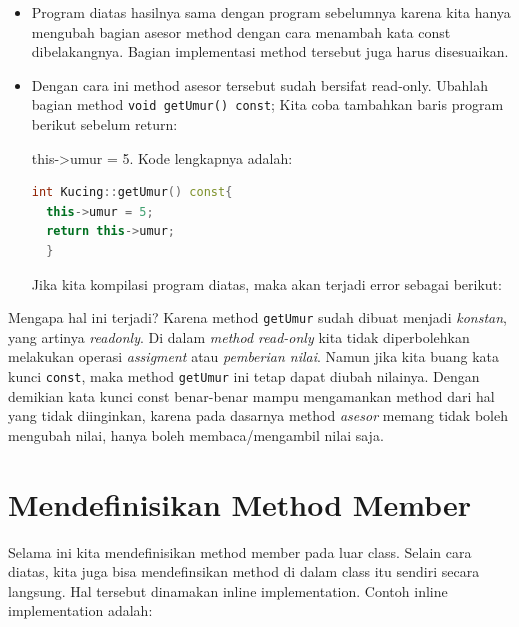 \begin{itemize}
\item
  Program diatas hasilnya sama dengan program sebelumnya karena kita
  hanya mengubah bagian asesor method dengan cara menambah kata const
  dibelakangnya. Bagian implementasi method tersebut juga harus
  disesuaikan.
\item
  Dengan cara ini method asesor tersebut sudah bersifat read-only.
  Ubahlah bagian method \texttt{void\ getUmur()\ const}; Kita coba
  tambahkan baris program berikut sebelum return:

  this-\textgreater{}umur = 5.
  Kode lengkapnya adalah:
  
  \begin{lstlisting}[language=c++, numbers=none]
  int Kucing::getUmur() const{
  this->umur = 5;
  return this->umur;
  }
  \end{lstlisting}
  
  Jika kita kompilasi program diatas, maka akan terjadi error sebagai
  berikut:
  
  \begin{figure}[htbp]
  	\centering
{}

  \end{figure}
\end{itemize}



Mengapa hal ini terjadi? Karena method \texttt{getUmur} sudah dibuat
menjadi \emph{konstan}, yang artinya \emph{readonly}. Di dalam
\emph{method read-only} kita tidak diperbolehkan melakukan operasi
\emph{assigment} atau \emph{pemberian nilai}. Namun jika kita buang kata
kunci \texttt{const}, maka method \texttt{getUmur} ini tetap dapat
diubah nilainya. Dengan demikian kata kunci const benar-benar mampu
mengamankan method dari hal yang tidak diinginkan, karena pada dasarnya
method \emph{asesor} memang tidak boleh mengubah nilai, hanya boleh
membaca/mengambil nilai saja.

\section{Mendefinisikan Method
Member}\label{mendefinisikan-method-member}

Selama ini kita mendefinisikan method member pada luar class. Selain
cara diatas, kita juga bisa mendefinsikan method di dalam class itu
sendiri secara langsung. Hal tersebut dinamakan inline implementation.
Contoh inline implementation adalah:


